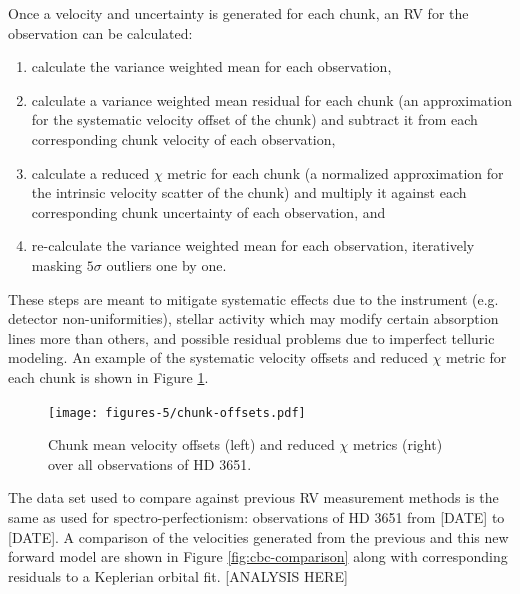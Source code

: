 Once a velocity and uncertainty is generated for each chunk, an RV for the observation can be calculated:
\begin{enumerate}
    \item calculate the variance weighted mean for each observation,
    \item calculate a variance weighted mean residual for each chunk (an approximation for the systematic velocity offset of the chunk) and subtract it from each corresponding chunk velocity of each observation,
    \item calculate a reduced $\chi$ metric for each chunk (a normalized approximation for the intrinsic velocity scatter of the chunk) and multiply it against each corresponding chunk uncertainty of each observation, and
    \item re-calculate the variance weighted mean for each observation, iteratively masking $5\sigma$ outliers one by one.
\end{enumerate}
These steps are meant to mitigate systematic effects due to the instrument (e.g. detector non-uniformities), stellar activity which may modify certain absorption lines more than others, and possible residual problems due to imperfect telluric modeling. An example of the systematic velocity offsets and reduced $\chi$ metric for each chunk is shown in Figure \ref{fig:chunk-offsets}.

\begin{figure}
    \centering
    \texttt{[image: figures-5/chunk-offsets.pdf]}
    \caption{Chunk mean velocity offsets (left) and reduced $\chi$ metrics (right) over all observations of HD 3651.}
    \label{fig:chunk-offsets}
\end{figure}

The data set used to compare against previous RV measurement methods is the same as used for spectro-perfectionism: observations of HD 3651 from [DATE] to [DATE]. A comparison of the velocities generated from the previous and this new forward model are shown in Figure \ref{fig:cbc-comparison} along with corresponding residuals to a Keplerian orbital fit. [ANALYSIS HERE]

